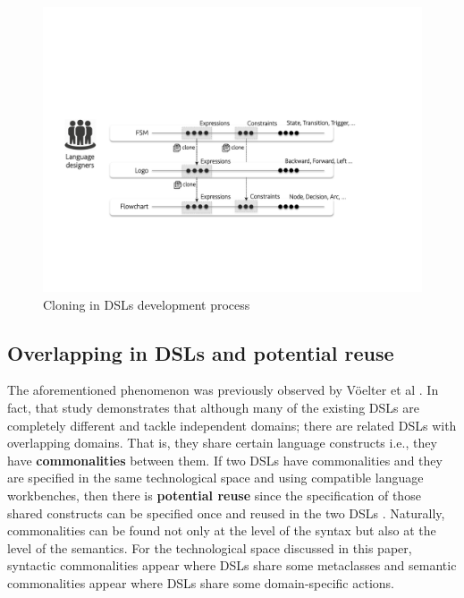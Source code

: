 \begin{figure}
\centering
\includegraphics[width=1\linewidth]{images/cloning.pdf}
\caption{Cloning in DSLs development process}
\label{fig:cloning}
\end{figure}




\subsection{Overlapping in DSLs and potential reuse}

The aforementioned phenomenon was previously observed by V\"oelter et al \cite[p. 60-61]{voelter:2013}. In fact, that study demonstrates that although many of the existing DSLs are completely different and tackle independent domains; there are related DSLs with overlapping domains. That is, they share certain language constructs i.e., they have \textbf{commonalities} between them. If two DSLs have commonalities and they are specified in the same technological space and using compatible language workbenches, then there is \textbf{potential reuse} since the specification of those shared constructs can be specified once and reused in the two DSLs \cite[p. 60-61]{voelter:2013}. Naturally, commonalities can be found not only at the level of the syntax but also at the level of the semantics. For the technological space discussed in this paper, syntactic commonalities appear where DSLs share some metaclasses and semantic commonalities appear where DSLs share some domain-specific actions.

